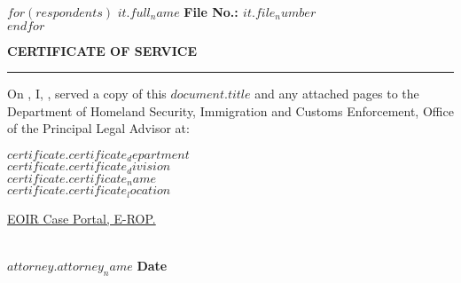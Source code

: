 \documentclass[12pt]{article}
\date{}
\begin{document}
$for(respondents)$
\noindent\textbf{\large $it.full_name$} \hfill \textbf{File No.: $it.file_number$} \\
$endfor$

\vspace{2em}

\begin{center}
    {\Large \textbf{CERTIFICATE OF SERVICE}}\\
    \rule{0.65\textwidth}{0.6pt} %
\end{center}

\vspace{2em}

\justifying
\noindent On \uline{\hspace{3cm}}, I, \uline{\hspace{10cm}}, served a copy of this \uline{$document.title$} and any attached pages to the Department of Homeland Security, Immigration and Customs Enforcement, Office of the Principal Legal Advisor at:

\vspace{1em}

\begin{flushleft}  
  \hspace{2em} \uline{$certificate.certificate_department$}\\
  \hspace{2em} \uline{$certificate.certificate_division$}\\
  \hspace{2em} \uline{$certificate.certificate_name$}\\
  \hspace{2em} \uline{$certificate.certificate_location$}
\end{flushleft}

\vspace{2em}

\noindent {} \underline{EOIR Case Portal, E-ROP.}

\vspace{4em}

\noindent\makebox[0.45\textwidth]{\hrulefill} \hfill \makebox[0.45\textwidth]{\hrulefill}\\
\noindent\textbf{$attorney.attorney_name$} \hfill \textbf{Date}
\end{document}
